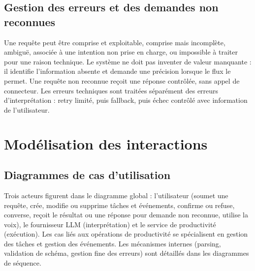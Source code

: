\documentclass[11pt,a4paper,openany,oneside]{report}
\begin{document}
\subsection{Gestion des erreurs et des demandes non reconnues}
Une requête peut être comprise et exploitable, comprise mais incomplète, ambiguë, associée à une intention non prise en charge, ou impossible à traiter pour une raison technique. Le système ne doit pas inventer de valeur manquante : il identifie l'information absente et demande une précision lorsque le flux le permet. Une requête non reconnue reçoit une réponse contrôlée, sans appel de connecteur. Les erreurs techniques sont traitées séparément des erreurs d'interprétation : retry limité, puis fallback, puis échec contrôlé avec information de l'utilisateur.

\section{Modélisation des interactions}
\subsection{Diagrammes de cas d'utilisation}
Trois acteurs figurent dans le diagramme global : l'utilisateur (soumet une requête, crée, modifie ou supprime tâches et événements, confirme ou refuse, converse, reçoit le résultat ou une réponse pour demande non reconnue, utilise la voix), le fournisseur LLM (interprétation) et le service de productivité (exécution). Les cas liés aux opérations de productivité se spécialisent en gestion des tâches et gestion des événements. Les mécanismes internes (parsing, validation de schéma, gestion fine des erreurs) sont détaillés dans les diagrammes de séquence.
\end{document}
